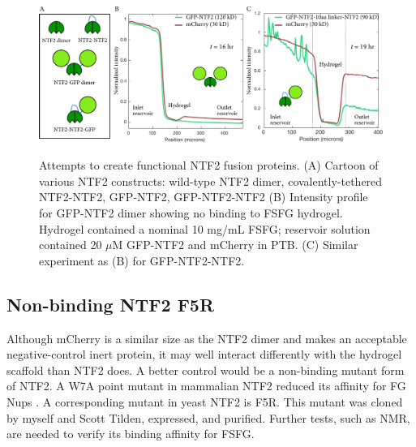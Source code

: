 \begin{figure} %
\caption{Attempts to create functional NTF2 fusion proteins. (A) Cartoon of various NTF2 constructs: wild-type NTF2 dimer, covalently-tethered NTF2-NTF2, GFP-NTF2, GFP-NTF2-NTF2 (B) Intensity profile for GFP-NTF2 dimer showing no binding to FSFG hydrogel.  Hydrogel contained a nominal 10 mg/mL FSFG; reservoir solution contained 20 $\mu$M GFP-NTF2 and mCherry in PTB.  (C) Similar experiment as (B) for GFP-NTF2-NTF2.}
\centering
\includegraphics[width=\textwidth]{figs/ch03/NTF2-constructs}
\label{fig:NTF2}
\end{figure}

\subsection{Non-binding NTF2 F5R}

Although mCherry is a similar size as the NTF2 dimer and makes an acceptable negative-control inert protein, it may well interact differently with the hydrogel scaffold than NTF2 does.  A better control would be a non-binding mutant form of NTF2.  A W7A point mutant in mammalian NTF2 reduced its affinity for FG Nups \cite{bayliss99,wagner15}.  A corresponding mutant in yeast NTF2 is F5R.  This mutant was cloned by myself and Scott Tilden, expressed, and purified. Further tests, such as NMR, are needed to verify its binding affinity for FSFG.

